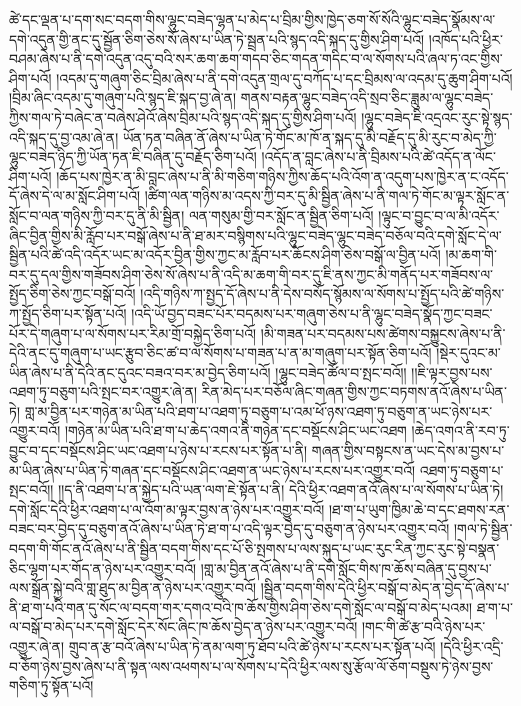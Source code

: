 ཚེ་དང་ལྡན་པ་དག་སང་བདག་གིས་ལྷུང་བཟེད་ལྷན་པ་མེད་པ་བྲིམ་གྱིས་ཁྱེད་ཅག་སོ་སོའི་ལྷུང་བཟེད་སྣོམས་ལ་དགེ་འདུན་གྱི་ནང་དུ་སྦྱོན་ཅིག་ཅེས་སོ་ཞེས་པ་ཡིན་ཏེ་སྦྲན་པའི་སྙད་འདི་སྐད་དུ་གྱིས་ཤིག་པའོ། །འཁོད་པའི་ཕྱིར་བཤམ་ཞེས་པ་ནི་དགེ་འདུན་འདུ་བའི་སར་ཆག་ཆག་གདབ་ཅིང་གདན་གདིང་བ་ལ་སོགས་པའི་ཞལ་ཏ་འང་གྱིས་ཤིག་པའོ། །འདམ་དུ་གཞུག་ཅིང་བྲིམ་ཞེས་པ་ནི་དགེ་འདུན་གྲལ་དུ་བཀོད་པ་དང་བྲིམས་ལ་འདམ་དུ་ཆུག་ཤིག་པའོ། །བྲིམ་ཞིང་འདམ་དུ་གཞུག་པའི་སྙད་ཇི་སྐད་བྱ་ཞེ་ན། གནས་བརྟན་ལྷུང་བཟེད་འདི་སྲབ་ཅིང་ཟླུམ་ལ་ལྷུང་བཟེད་ཀྱིས་གལ་ཏེ་བཞེང་ན་བཞེས་ཤེའོ་ཞེས་བྲིམ་པའི་སྙད་འདི་སྐད་དུ་གྱིས་ཤིག་པའོ། །ལྷུང་བཟེད་ཇི་འདྲའང་རུང་སྟེ་སྙད་འདི་སྐད་དུ་བྱ་འམ་ཞེ་ན། ཡོན་ཏན་བཞིན་ནོ་ཞེས་པ་ཡིན་ཏེ་གོང་མ་ཁོ་ན་སྐད་དུ་མི་བརྗོད་དུ་མི་རུང་བ་མེད་ཀྱི་ལྷུང་བཟེད་ཉིད་ཀྱི་ཡོན་ཏན་ཇི་བཞིན་དུ་བརྗོད་ཅིག་པའོ། །འདོད་ན་བླང་ཞེས་པ་ནི་བྲིམས་པའི་ཚེ་འདོད་ན་ལོང་ཤིག་པའོ། །ཆོད་པས་ཁྱེར་ན་མི་བླང་ཞེས་པ་ནི་མི་གཅིག་གཉིས་ཀྱིས་ཆོད་པའི་འོག་ན་འདུག་པས་ཁྱེར་ན་ང་འདོད་དོ་ཞེས་དེ་ལ་མ་སློང་ཤིག་པའོ། །ཚིག་ལན་གཉིས་མ་འདས་ཀྱི་བར་དུ་མི་སྦྱིན་ཞེས་པ་ནི་གལ་ཏེ་གོང་མ་ལྟར་སློང་ན་སློང་བ་ལན་གཉིས་ཀྱི་བར་དུ་ནི་མི་སྦྱིན། ལན་གསུམ་གྱི་བར་སློང་ན་སྦྱིན་ཅིག་པའོ། །ལྟུང་བ་བྱུང་བ་ལ་མི་འདོར་ཞིང་བྱིན་གྱིས་མི་རློབ་པར་བསྒོ་ཞེས་པ་ནི་ཐ་མར་བསྙིགས་པའི་ལྷུང་བཟེད་ལྷུང་བཟེད་བཅོལ་བའི་དགེ་སློང་དེ་ལ་སྦྱིན་པའི་ཚེ་འདི་འདོར་ཡང་མ་འདོར་བྱིན་གྱིས་ཀྱང་མ་རློབ་པར་ཆོངས་ཤིག་ཅེས་བསྒོ་ལ་བྱིན་པའོ། །མ་ཆག་གི་བར་དུ་དལ་གྱིས་གཟོབས་ཤིག་ཅེས་སོ་ཞེས་པ་ནི་འདི་མ་ཆག་གི་བར་དུ་ཇི་ནས་ཀྱང་མི་གནོད་པར་གཟོབས་ལ་སྤྱོད་ཅིག་ཅེས་ཀྱང་བསྒོ་བའོ། །འདི་གཉིས་ཀ་སྤྱད་དོ་ཞེས་པ་ནི་དེས་བསོད་སྙོམས་ལ་སོགས་པ་སྤྱོད་པའི་ཚེ་གཉིས་ཀ་སྤྱོད་ཅིག་པར་སྟོན་པའོ། །འདི་ཡོ་བྱད་བཟང་པོར་བདམས་པར་གཞུག་ཅེས་པ་ནི་ལྷུང་བཟེད་སྣོད་ཀྱང་བཟང་པོར་དེ་གཞུག་པ་ལ་སོགས་པར་རིམ་གྲོ་བསྐྱེད་ཅིག་པའོ། །མི་གཟན་པར་བདམས་པས་ཚེགས་བསྐྱུངས་ཞེས་པ་ནི་དེའི་ནང་དུ་གཞུག་པ་ཡང་རྩུབ་ཅིང་ཚ་བ་ལ་སོགས་པ་གཟན་པ་ན་མ་གཞུག་པར་སྟོན་ཅིག་པའོ། །སྡེར་དུའང་མ་ཡིན་ཞེས་པ་ནི་དེའི་ནང་དུའང་བཟའ་བར་མ་བྱེད་ཅིག་པའོ། །ལྷུང་བཟེད་ཚོལ་བ་སྤང་བའོ།། །།ཇི་ལྟར་བྱས་པས་འཐག་ཏུ་བཅུག་པའི་སྤང་བར་འགྱུར་ཞེ་ན། རིན་མེད་པར་བཅོལ་ཞིང་གཞན་གྱིས་ཀྱང་བཏགས་ནའོ་ཞེས་པ་ཡིན་ཏེ། གླ་མ་བྱིན་པར་གཉེན་མ་ཡིན་པའི་ཐག་པ་འཐག་ཏུ་བཅུག་པ་འམ་ཕོ་ཉས་འཐག་ཏུ་བཅུག་ན་ཡང་ཉེས་པར་འགྱུར་བའོ། །གཉེན་མ་ཡིན་པའི་ཐ་ག་པ་ཆེད་འགའ་ནི་གཉེན་དང་བསྡོངས་ཤིང་ཡང་འཐག །ཆེད་འགའ་ནི་རབ་ཏུ་བྱུང་བ་དང་བསྡོངས་ཤིང་ཡང་འཐག་པ་ཉེས་པ་རངས་པར་སྟོན་པ་ནི། གཞན་གྱིས་བསྟངས་ན་ཡང་དེས་མ་བྱས་པ་མ་ཡིན་ཞེས་པ་ཡིན་ཏེ་གཞན་དང་བསྡོངས་ཤིང་འཐག་ན་ཡང་ཉེས་པ་རངས་པར་འགྱུར་བའོ། འཐག་ཏུ་བཅུག་པ་སྤང་བའོ།། །།ད་ནི་འཐག་པ་ན་སྐྱེད་པའི་ཡན་ལག་ཇེ་སྟོན་པ་ནི། དེའི་ཕྱིར་འཐག་ནའོ་ཞེས་པ་ལ་སོགས་པ་ཡིན་ཏེ། དགེ་སློང་དེའི་ཕྱིར་འཐག་པ་ལ་འོག་མ་ལྟར་བྱས་ན་ཉེས་པར་འགྱུར་བའོ། །ཐ་ག་པ་ཡུག་ཁྱིམ་ཆེ་བ་དང་ཐགས་རན་བཟང་བར་བྱེད་དུ་བཅུག་ནའོ་ཞེས་པ་ཡིན་ཏེ་ཐ་ག་པ་འདི་ལྟར་བྱེད་དུ་བཅུག་ན་ཉེས་པར་འགྱུར་བའོ། །གལ་ཏེ་སྦྱིན་བདག་གི་གོང་ནའོ་ཞེས་པ་ནི་སྦྱིན་བདག་གིས་དང་པོ་ཅི་སྤགས་པ་ལས་སྐུད་པ་ཡང་རུང་རིན་ཀྱང་རུང་སྟེ་བསྣན་ཅིང་ལྷག་པར་གོད་ན་ཉེས་པར་འགྱུར་བའོ། །གླ་མ་བྱིན་ནའོ་ཞེས་པ་ནི་དགེ་སློང་གིས་ཁ་ཆོས་བཞིན་དུ་བྱས་པ་ལས་སྒྲོན་སྐྱེ་བའི་གླ་ཐུད་མ་བྱིན་ན་ཉེས་པར་འགྱུར་བའོ། །སྦྱིན་བདག་གིས་དེའི་ཕྱིར་བསྒོ་བ་མེད་ན་བྱེད་དོ་ཞེས་པ་ནི་ཐ་ག་པའི་གན་དུ་སོང་ལ་བདག་གར་དགའ་བའི་ཁ་ཆོས་གྱིས་ཤིག་ཅེས་དགེ་སློང་ལ་བསྒོ་བ་མེད་པའམ། ཐ་ག་པ་ལ་བསྒོ་བ་མེད་པར་དགེ་སློང་དེར་སོང་ཞིང་ཁ་ཆོས་བྱེད་ན་ཉེས་པར་འགྱུར་བའོ། །གང་གི་ཚེ་རྩ་བའི་ཉེས་པར་འགྱུར་ཞེ་ན། གྲུབ་ན་རྩ་བའོ་ཞེས་པ་ཡིན་ཏེ་ནམ་ལག་ཏུ་ཐོབ་པའི་ཚེ་ཉེས་པ་རངས་པར་སྟོན་པའོ། །དེའི་ཕྱིར་འདྲི་བ་ཅོག་ཉེས་བྱས་ཞེས་པ་ནི་སྟན་ལས་འཕགས་པ་ལ་སོགས་པ་དེའི་ཕྱིར་ལས་སུ་རྩོལ་ལོ་ཅོག་བསྡུས་ཏེ་ཉེས་བྱས་གཅིག་ཏུ་སྟོན་པའོ། 